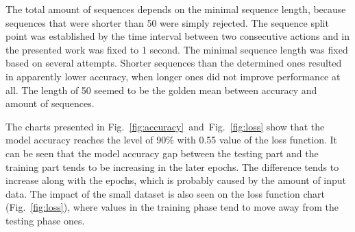 The total amount of sequences depends on the minimal sequence length, because sequences that were shorter than 50 were simply rejected.
The sequence split point was established by the time interval between two consecutive actions and in the presented work was fixed to 1 second.
The minimal sequence length was fixed based on several attempts.
Shorter sequences than the determined ones resulted in apparently lower accuracy, when longer ones did not improve performance at all.
The length of 50 seemed to be the golden mean between accuracy and amount of sequences.

The charts presented in \mbox{Fig.~\ref{fig:accuracy} and Fig.~\ref{fig:loss}} show that the model accuracy reaches the level of 90\% with 0.55 value of the loss function.
It can be seen that the model accuracy gap between the testing part and the training part tends to be increasing in the later epochs.
The difference tends to increase along with the epochs, which is probably caused by the amount of input data.
The impact of the small dataset is also seen on the loss function chart \mbox{(Fig.~\ref{fig:loss})}, where values in the training phase tend to move away from the testing phase ones.

